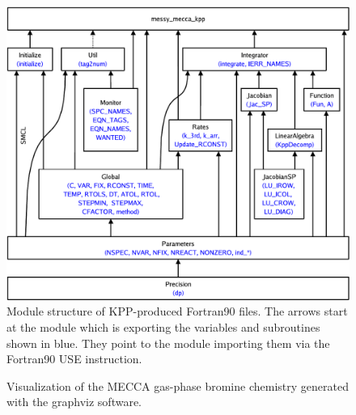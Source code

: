 \documentclass[twoside]{article}
\begin{document}
\begin{figure}
  \begin{center}
    \includegraphics[width=\textwidth]{kpp_use_diagr}
  \end{center}
  \caption{Module structure of KPP-produced Fortran90 files. The arrows
    start at the module which is exporting the variables and subroutines
    shown in blue. They point to the module importing them via the
    Fortran90 USE instruction.}
  \label{fig:kpp_use_diagr}
\end{figure}

\begin{figure}
  \begin{center}
  \end{center}
  \caption{Visualization of the MECCA gas-phase bromine chemistry
    generated with the graphviz software.}
  \label{fig:Br}
\end{figure}
\end{document}
